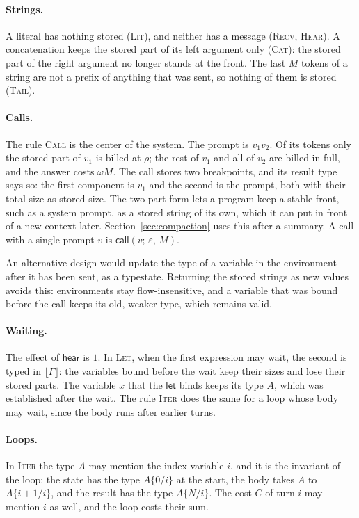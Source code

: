 \documentclass[acmsmall,nonacm,screen]{acmart}
\newcommand{\kw}[1]{\mathsf{#1}}
\newcommand{\call}[3]{\kw{call}(#1;\,#2,\,#3)}
\newcommand{\fl}[1]{\lfloor #1 \rfloor}
\newcommand{\eps}{\varepsilon}
\begin{document}
\paragraph{Strings.} A literal has nothing stored (\textsc{Lit}), and neither has a message
(\textsc{Recv}, \textsc{Hear}). A concatenation keeps the stored part of its left argument
only (\textsc{Cat}): the stored part of the right argument no longer stands at the front. The
last $M$ tokens of a string are not a prefix of anything that was sent, so nothing of them is
stored (\textsc{Tail}).

\paragraph{Calls.} The rule \textsc{Call} is the center of the system. The prompt is $v_1v_2$.
Of its tokens only the stored part of $v_1$ is billed at $\rho$; the rest of $v_1$ and all of
$v_2$ are billed in full, and the answer costs $\omega M$. The call stores two breakpoints, and
its result type says so: the first component is $v_1$ and the second is the prompt, both with
their total size as stored size. The two-part form lets a program keep a stable front, such as
a system prompt, as a stored string of its own, which it can put in front of a new context
later. Section~\ref{sec:compaction} uses this after a summary. A call with a single prompt
$v$ is $\call{v}{\eps}{M}$.

An alternative design would update the type of a variable in the environment after it has been
sent, as a typestate. Returning the stored strings as new values avoids this: environments
stay flow-insensitive, and a variable that was bound before the call keeps its old, weaker
type, which remains valid.

\paragraph{Waiting.} The effect of $\kw{hear}$ is $1$. In \textsc{Let}, when the first
expression may wait, the second is typed in $\fl{\Gamma}$: the variables bound before the wait
keep their sizes and lose their stored parts. The variable $x$ that the $\kw{let}$ binds keeps
its type $A$, which was established after the wait. The rule \textsc{Iter} does the same for a
loop whose body may wait, since the body runs after earlier turns.

\paragraph{Loops.} In \textsc{Iter} the type $A$ may mention the index variable $i$, and it is
the invariant of the loop: the state has the type $A\{0/i\}$ at the start, the body takes
$A$ to $A\{i+1/i\}$, and the result has the type $A\{N/i\}$. The cost $C$ of turn $i$ may
mention $i$ as well, and the loop costs their sum.
\end{document}
